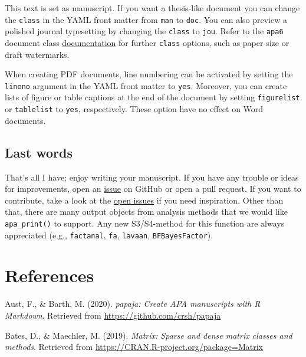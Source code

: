 \documentclass[
  english,
  man]{apa6}
\begin{document}
This text is set as manuscript.
If you want a thesis-like document you can change the \texttt{class} in the YAML front matter from \texttt{man} to \texttt{doc}.
You can also preview a polished journal typesetting by changing the \texttt{class} to \texttt{jou}.
Refer to the \texttt{apa6} document class \href{ftp://ftp.fu-berlin.de/tex/CTAN/macros/latex/contrib/apa6/apa6.pdf}{documentation} for further \texttt{class} options, such as paper size or draft watermarks.

When creating PDF documents, line numbering can be activated by setting the \texttt{lineno} argument in the YAML front matter to \texttt{yes}.
Moreover, you can create lists of figure or table captions at the end of the document by setting \texttt{figurelist} or \texttt{tablelist} to \texttt{yes}, respectively.
These option have no effect on Word documents.

\hypertarget{last-words}{%
\subsection{Last words}\label{last-words}}

That's all I have; enjoy writing your manuscript.
If you have any trouble or ideas for improvements, open an \href{https://github.com/crsh/papaja/issues}{issue} on GitHub or open a pull request.
If you want to contribute, take a look at the \href{https://github.com/crsh/papaja/issues}{open issues} if you need inspiration.
Other than that, there are many output objects from analysis methods that we would like \texttt{apa\_print()} to support.
Any new S3/S4-method for this function are always appreciated (e.g., \texttt{factanal}, \texttt{fa}, \texttt{lavaan}, \texttt{BFBayesFactor}).

\hypertarget{references}{%
\section{References}\label{references}}

\setlength{\parindent}{-0.5in}
\setlength{\leftskip}{0.5in}

\hypertarget{refs}{}
\leavevmode\hypertarget{ref-R-papaja}{}%
Aust, F., \& Barth, M. (2020). \emph{papaja: Create APA manuscripts with R Markdown}. Retrieved from \url{https://github.com/crsh/papaja}

\leavevmode\hypertarget{ref-R-Matrix}{}%
Bates, D., \& Maechler, M. (2019). \emph{Matrix: Sparse and dense matrix classes and methods}. Retrieved from \url{https://CRAN.R-project.org/package=Matrix}
\end{document}
